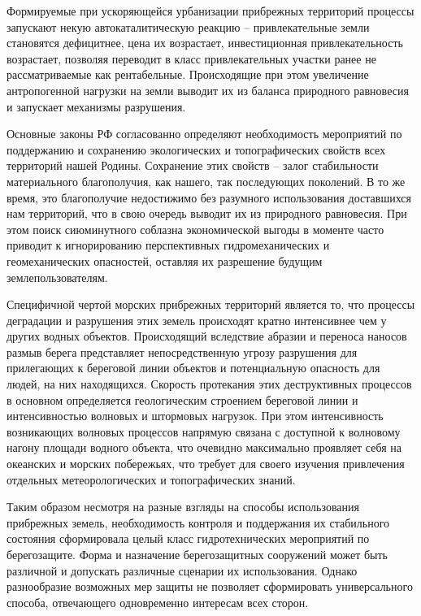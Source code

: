 Формируемые при ускоряющейся урбанизации прибрежных территорий процессы запускают некую автокаталитическую реакцию -- привлекательные земли становятся дефицитнее, цена их возрастает, инвестиционная привлекательность возрастает, позволяя переводит в класс привлекательных участки ранее не рассматриваемые как рентабельные.
Происходящие при этом увеличение антропогенной нагрузки на земли выводит их из баланса природного равновесия и запускает механизмы разрушения.

Основные законы РФ согласованно определяют необходимость мероприятий по поддержанию и сохранению экологических и топографических свойств всех территорий нашей Родины.
Сохранение этих свойств -- залог стабильности материального благополучия, как нашего, так последующих поколений.
В то же время, это благополучие недостижимо без разумного использования доставшихся нам территорий, что в свою очередь выводит их из природного равновесия.
При этом поиск сиюминутного соблазна экономической выгоды в моменте часто приводит к игнорированию перспективных гидромеханических и геомеханических опасностей, оставляя их разрешение будущим землепользователям.

Специфичной чертой морских прибрежных территорий является то, что процессы деградации и разрушения этих земель происходят кратно интенсивнее чем у других водных объектов.
Происходящий вследствие абразии и переноса наносов размыв берега представляет непосредственную угрозу разрушения для прилегающих к береговой линии объектов и потенциальную опасность для людей, на них находящихся.
Скорость протекания этих деструктивных процессов в основном определяется геологическим строением береговой линии и интенсивностью волновых и штормовых нагрузок. 
При этом интенсивность возникающих волновых процессов напрямую связана с доступной к волновому нагону площади водного объекта, что очевидно максимально проявляет себя на океанских и морских побережьях, что требует для своего изучения привлечения отдельных метеорологических и топографических знаний. 

Таким образом несмотря на разные взгляды на способы использования прибрежных земель, необходимость контроля и поддержания их стабильного состояния сформировала целый класс гидротехнических мероприятий по берегозащите.
Форма и назначение берегозащитных сооружений может быть различной и допускать различные сценарии их использования.
Однако разнообразие возможных мер защиты не позволяет сформировать универсального способа, отвечающего одновременно интересам всех сторон.

